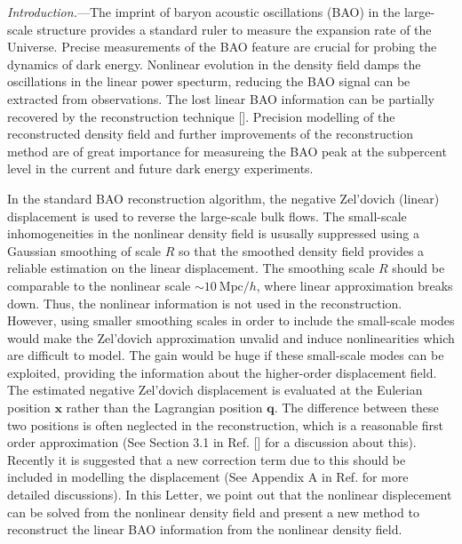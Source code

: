 \documentclass[aps,prd,twocolumn,showpacs,superscriptaddress,groupedaddress,nofootinbib]{revtex4}  %
\newcommand{\mr}{\mathrm}
\begin{document}

{\it Introduction.}---The imprint of baryon acoustic oscillations (BAO) in the
large-scale structure provides a standard ruler to measure the expansion rate
of the Universe. Precise measurements of the BAO feature are crucial for 
probing the dynamics of dark energy.
Nonlinear evolution in the density field damps the oscillations in the linear
power specturm, reducing the BAO signal can be extracted from observations. 
The lost linear BAO information can be partially recovered by the reconstruction
technique []. Precision modelling of the reconstructed density field and 
further improvements of the reconstruction method are of great importance
for measureing the BAO peak at the subpercent level in the current and future
dark energy experiments.

In the standard BAO reconstruction algorithm, the negative Zel'dovich (linear)
displacement is used to reverse the large-scale bulk flows.
The small-scale inhomogeneities in the nonlinear density field is ususally
suppressed using a Gaussian smoothing of scale $R$ so that the smoothed density
field provides a reliable estimation on the linear displacement.
The smoothing scale $R$ should be comparable to the nonlinear scale 
$\sim10\ \mr{Mpc}/h$, where linear approximation breaks down.
Thus, the nonlinear information is not used in the reconstruction. 
However, using smaller smoothing scales in order to include the small-scale 
modes would make the Zel'dovich approximation unvalid and induce
nonlinearities which are difficult to model.
The gain would be huge if these small-scale modes can be exploited, providing
the information about the higher-order displacement field.
The estimated negative Zel'dovich displacement is evaluated at the Eulerian 
position $\bm{x}$ rather than the Lagrangian position $\bm{q}$. The difference
between these two positions is often neglected in the reconstruction, which
is a reasonable first order approximation (See Section 3.1 in Ref. [] for a 
discussion about this). Recently it is suggested that a new correction term
due to this should be included in modelling the displacement (See Appendix A
in Ref.  for more detailed discussions).
In this Letter, we point out that the nonlinear displecement can be solved
from the nonlinear density field and present a new method to reconstruct
the linear BAO information from the nonlinear density field.
\end{document}

